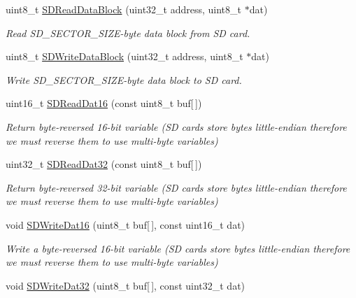 \begin{DoxyCompactItemize}
uint8\-\_\-t \hyperlink{group__sd__private_ga9cb0901da7dfeeb211dd30671d7640a4}{\-S\-D\-Read\-Data\-Block} (uint32\-\_\-t address, uint8\-\_\-t $\ast$dat)
\begin{DoxyCompactList}\small\item\em \-Read \-S\-D\-\_\-\-S\-E\-C\-T\-O\-R\-\_\-\-S\-I\-Z\-E-\/byte data block from \-S\-D card. \end{DoxyCompactList}\item 
uint8\-\_\-t \hyperlink{group__sd__private_ga96ae7f7f33c4f6f3f1a90450fa70fe20}{\-S\-D\-Write\-Data\-Block} (uint32\-\_\-t address, uint8\-\_\-t $\ast$dat)
\begin{DoxyCompactList}\small\item\em \-Write \-S\-D\-\_\-\-S\-E\-C\-T\-O\-R\-\_\-\-S\-I\-Z\-E-\/byte data block to \-S\-D card. \end{DoxyCompactList}\item 
uint16\-\_\-t \hyperlink{group__sd__private_ga09f0fce8aede67604aef626c5279a3a7}{\-S\-D\-Read\-Dat16} (const uint8\-\_\-t buf\mbox{[}$\,$\mbox{]})
\begin{DoxyCompactList}\small\item\em \-Return byte-\/reversed 16-\/bit variable (\-S\-D cards store bytes little-\/endian therefore we must reverse them to use multi-\/byte variables) \end{DoxyCompactList}\item 
uint32\-\_\-t \hyperlink{group__sd__private_ga1d0dd969067387e8002c03483871aa47}{\-S\-D\-Read\-Dat32} (const uint8\-\_\-t buf\mbox{[}$\,$\mbox{]})
\begin{DoxyCompactList}\small\item\em \-Return byte-\/reversed 32-\/bit variable (\-S\-D cards store bytes little-\/endian therefore we must reverse them to use multi-\/byte variables) \end{DoxyCompactList}\item 
void \hyperlink{group__sd__private_ga555404275cd1337a0af1d886cef46d94}{\-S\-D\-Write\-Dat16} (uint8\-\_\-t buf\mbox{[}$\,$\mbox{]}, const uint16\-\_\-t dat)
\begin{DoxyCompactList}\small\item\em \-Write a byte-\/reversed 16-\/bit variable (\-S\-D cards store bytes little-\/endian therefore we must reverse them to use multi-\/byte variables) \end{DoxyCompactList}\item 
void \hyperlink{group__sd__private_ga089b5f011ba661fcbf84e5c27372625f}{\-S\-D\-Write\-Dat32} (uint8\-\_\-t buf\mbox{[}$\,$\mbox{]}, const uint32\-\_\-t dat)

\end{DoxyCompactItemize}
